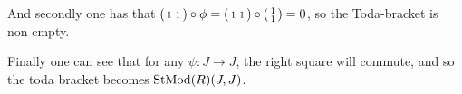 And secondly one has that \( \begin{psmallmatrix}
		1 & 1 \\
	\end{psmallmatrix} \circ \phi = \begin{psmallmatrix}
		1 & 1 \\
	\end{psmallmatrix} \circ \begin{psmallmatrix}
		1 \\ 1 \\
	\end{psmallmatrix} = 0 \), so the Toda-bracket is non-empty.

Finally one can see that for any \( \psi: J \to J \), the right square will commute, and so the toda bracket becomes \( \operatorname{StMod}(R)(J, J) \).